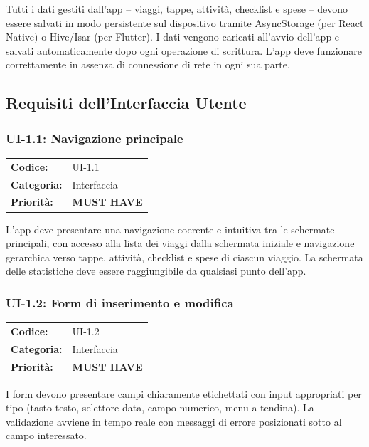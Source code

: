 \documentclass[12pt, a4paper]{article}
\newcommand{\MUST}{\colorbox{musthave}{\small\textbf{MUST HAVE}}}
\begin{document}
\medskip
\noindent
Tutti i dati gestiti dall'app -- viaggi, tappe, attività, checklist e spese -- devono
essere salvati in modo persistente sul dispositivo tramite AsyncStorage (per React Native)
o Hive/Isar (per Flutter). I dati vengono caricati all'avvio dell'app e salvati
automaticamente dopo ogni operazione di scrittura. L'app deve funzionare correttamente
in assenza di connessione di rete in ogni sua parte.

\subsection{Requisiti dell'Interfaccia Utente}

\subsubsection{UI-1.1: Navigazione principale}

\begin{tabular}{@{}ll@{}}
  \toprule
  \textbf{Codice:}    & UI-1.1 \\
  \textbf{Categoria:} & Interfaccia \\
  \textbf{Priorità:}  & \MUST \\
  \bottomrule
\end{tabular}

\medskip
\noindent
L'app deve presentare una navigazione coerente e intuitiva tra le schermate principali,
con accesso alla lista dei viaggi dalla schermata iniziale e navigazione gerarchica
verso tappe, attività, checklist e spese di ciascun viaggio. La schermata delle
statistiche deve essere raggiungibile da qualsiasi punto dell'app.

\subsubsection{UI-1.2: Form di inserimento e modifica}

\begin{tabular}{@{}ll@{}}
  \toprule
  \textbf{Codice:}    & UI-1.2 \\
  \textbf{Categoria:} & Interfaccia \\
  \textbf{Priorità:}  & \MUST \\
  \bottomrule
\end{tabular}

\medskip
\noindent
I form devono presentare campi chiaramente etichettati con input appropriati per tipo
(tasto testo, selettore data, campo numerico, menu a tendina). La validazione avviene
in tempo reale con messaggi di errore posizionati sotto al campo interessato.
\end{document}

